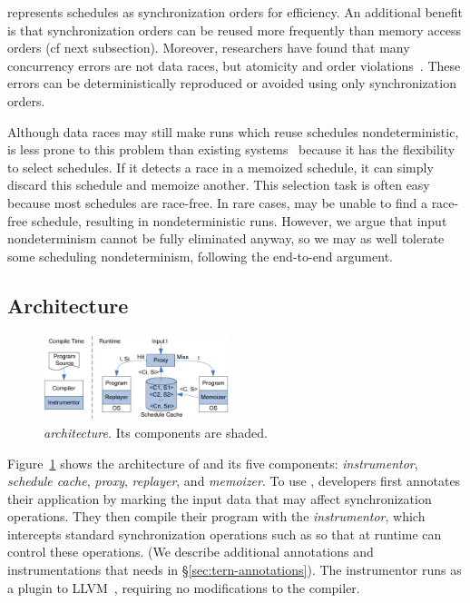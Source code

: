 \tern represents schedules as synchronization orders for efficiency.  An
additional benefit is that synchronization orders can be reused more
frequently than memory access orders (cf next subsection).
Moreover, researchers have found that many concurrency errors
are not data races, but atomicity and order
violations~\cite{lu:concurrency-bugs}.  These errors can be
deterministically reproduced or avoided using only  synchronization orders.

Although data races may still make runs which reuse schedules nondeterministic,
\tern is less prone to this problem than existing \dmt
systems~\cite{kendo:asplos09} because it has the flexibility to select
schedules.  If it detects a race in a memoized schedule, it can simply
discard this schedule and memoize another.  This selection task is often
easy because most schedules are race-free.  In rare cases, \tern may be
unable to find a race-free schedule, resulting in nondeterministic runs.
However, we argue that input nondeterminism cannot be fully eliminated
anyway, so we may as well tolerate some scheduling nondeterminism,
following the end-to-end argument.

\subsection{Architecture} \label{sec:tern-arch}

\begin{figure}[t]
\begin{center}
\includegraphics[width=0.48\textwidth]{tern/figures/overview.eps}
\end{center}
\caption{\emph{\tern architecture.} Its components are shaded.}
\label{fig:tern-overview}
\end{figure}

Figure~\ref{fig:tern-overview} shows the architecture of \tern and its five
components: \emph{instrumentor}, \emph{schedule cache}, \emph{proxy},
\emph{replayer}, and \emph{memoizer}.  To use \tern, developers first
annotates their application by marking the input data that may affect
synchronization operations.  They then compile their program with the
\emph{instrumentor}, which intercepts standard synchronization operations
such as  so that at runtime \tern can control
these operations.  (We describe additional annotations and
instrumentations that \tern needs in \S\ref{sec:tern-annotations}).  The
instrumentor runs as a plugin to LLVM~\cite{llvm}, requiring no
modifications to the compiler.

